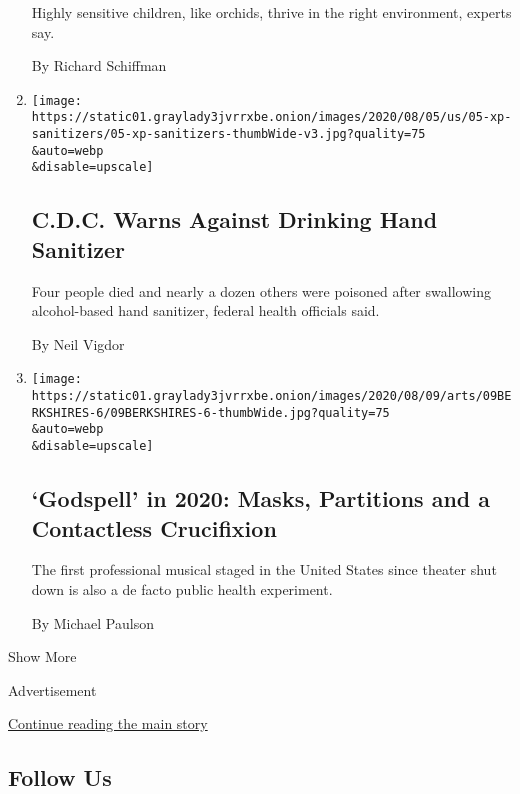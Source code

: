 \begin{enumerate}
  Highly sensitive children, like orchids, thrive in the right
  environment, experts say.

  By Richard Schiffman
\item
  \href{/2020/08/05/us/drinking-hand-sanitizer.html}{}

  \texttt{[image: https://static01.graylady3jvrrxbe.onion/images/2020/08/05/us/05-xp-sanitizers/05-xp-sanitizers-thumbWide-v3.jpg?quality=75\\\&auto=webp\\\&disable=upscale]}

  \hypertarget{cdc-warns-against-drinking-hand-sanitizer}{%
  \subsection{C.D.C. Warns Against Drinking Hand
  Sanitizer}\label{cdc-warns-against-drinking-hand-sanitizer}}

  Four people died and nearly a dozen others were poisoned after
  swallowing alcohol-based hand sanitizer, federal health officials
  said.

  By Neil Vigdor
\item
  \href{/2020/08/05/theater/godspell-berkshires-coronavirus.html}{}

  \texttt{[image: https://static01.graylady3jvrrxbe.onion/images/2020/08/09/arts/09BERKSHIRES-6/09BERKSHIRES-6-thumbWide.jpg?quality=75\\\&auto=webp\\\&disable=upscale]}

  \hypertarget{godspell-in-2020-masks-partitions-and-a-contactless-crucifixion}{%
  \subsection{`Godspell' in 2020: Masks, Partitions and a Contactless
  Crucifixion}\label{godspell-in-2020-masks-partitions-and-a-contactless-crucifixion}}

  The first professional musical staged in the United States since
  theater shut down is also a de facto public health experiment.

  By Michael Paulson
\end{enumerate}

Show More

Advertisement

\protect\hyperlink{after-mid3}{Continue reading the main story}

\hypertarget{follow-us}{%
\subsection{Follow Us}\label{follow-us}}

